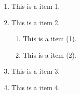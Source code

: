 \documentclass{article}
\begin{document}
\begin{enumerate}[Exzmple-1.]
\item This is a item 1.
\item This is a item 2.
  \begin{enumerate}[(1)]
  \item This is a item (1).
  \item This is a item (2).
  \end{enumerate}
\item This is a item 3.
\item This is a item 4.
\end{enumerate}
\end{document}
